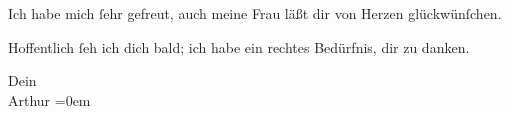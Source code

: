 \pstart
           Ich habe mich{ }ſehr gefreut, auch meine Frau läßt dir von Herzen glückwünſchen.\pend
           
\pstart
           Hoffentlich{ }ſeh ich dich bald; ich habe ein rechtes Bedürfnis, dir zu danken.\pend
           
\pstart
           Dein{\\[\baselineskip]}\spacefill\mbox{Arthur}\pend
           \leftskip=0em{}\endnumbering{}  \newcommand{\dateiname}{L01523}\newcommand{\titel}{Arthur Schnitzler an Hermann Bahr, 6. 6. 1905}\newcommand{\editorInnen}{Herausgegeben von Martin Anton Müller}
